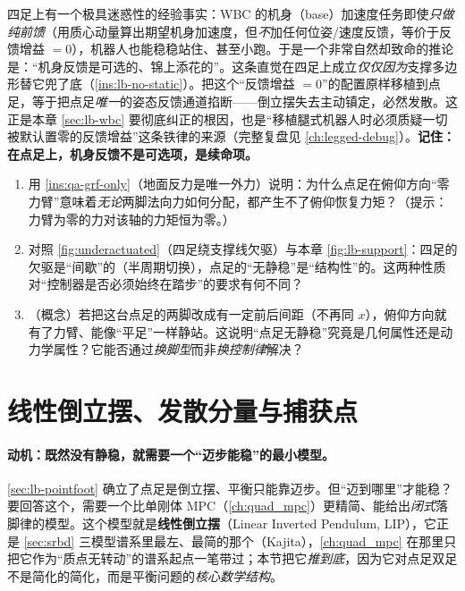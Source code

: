 \begin{pitfall}\label{pit:lb-quad-intuition}
四足上有一个极具迷惑性的经验事实：WBC 的机身（base）加速度任务即使\emph{只做纯前馈}（用质心动量算出期望机身加速度，但\emph{不}加任何位姿/速度反馈，等价于反馈增益 $=0$），机器人也能稳稳站住、甚至小跑。于是一个非常自然却致命的推论是：“机身反馈是可选的、锦上添花的”。这条直觉在四足上成立\emph{仅仅因为}支撑多边形替它兜了底（\cref{ins:lb-no-static}）。把这个“反馈增益 $=0$”的配置原样移植到点足，等于把点足\emph{唯一}的姿态反馈通道掐断——倒立摆失去主动镇定，必然发散。这正是本章 \cref{sec:lb-wbc} 要彻底纠正的根因，也是“移植腿式机器人时必须质疑一切被默认置零的反馈增益”这条铁律的来源（完整复盘见 \cref{ch:legged-debug}）。\textbf{记住：在点足上，机身反馈不是可选项，是续命项。}
\end{pitfall}

\begin{practice}
\begin{enumerate}
  \item 用 \cref{ins:qa-grf-only}（地面反力是唯一外力）说明：为什么点足在俯仰方向“零力臂”意味着\emph{无论}两脚法向力如何分配，都产生不了俯仰恢复力矩？（提示：力臂为零的力对该轴的力矩恒为零。）
  \item 对照 \cref{fig:underactuated}（四足绕支撑线欠驱）与本章 \cref{fig:lb-support}：四足的欠驱是“间歇”的（半周期切换），点足的“无静稳”是“结构性”的。这两种性质对“控制器是否必须始终在踏步”的要求有何不同？
  \item （概念）若把这台点足的两脚改成有一定前后间距（不再同 $x$），俯仰方向就有了力臂、能像“平足”一样静站。这说明“点足无静稳”究竟是几何属性还是动力学属性？它能否通过\emph{换脚型}而非\emph{换控制律}解决？
\end{enumerate}
\end{practice}

\section{线性倒立摆、发散分量与捕获点}
\label{sec:lb-lip}

\paragraph{动机：既然没有静稳，就需要一个“迈步能稳”的最小模型。}
\cref{sec:lb-pointfoot} 确立了点足是倒立摆、平衡只能靠迈步。但“迈到哪里”才能稳？要回答这个，需要一个比单刚体 MPC（\cref{ch:quad_mpc}）更精简、能给出\emph{闭式}落脚律的模型。这个模型就是\textbf{线性倒立摆}（Linear Inverted Pendulum, LIP），它正是 \cref{sec:srbd} 三模型谱系里最左、最简的那个（Kajita\cite{kajita2001lipm}），\cref{ch:quad_mpc} 在那里只把它作为“质点无转动”的谱系起点一笔带过；本节把它\emph{推到底}，因为它对点足双足不是简化的简化，而是平衡问题的\emph{核心数学结构}。

